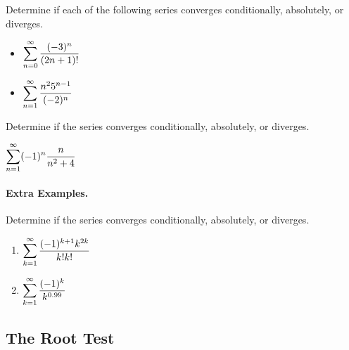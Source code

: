 \documentclass[12pt]{article}
\begin{document}
\newpage

\Examples Determine if each of the following series converges conditionally, absolutely, or diverges.

\begin{itemize}
\item[\tc{1}] $\displaystyle\sum_{n=0}^\infty\dfrac{(-3)^n}{(2n+1)!}$

\vfill

\item[\tc{2}] $\displaystyle\sum_{n=1}^\infty\dfrac{n^2 5^{n-1}}{(-2)^n}$

\vfill

\newpage

\end{itemize}

\Example Determine if the series converges conditionally, absolutely, or diverges.

\vspace{3mm}

$\displaystyle\sum_{n=1}^\infty(-1)^n\dfrac{n}{n^2+4}$
\vfill

\paragraph*{Extra Examples.} Determine if the series converges conditionally, absolutely, or diverges.

\begin{multicols}{2}
\begin{enumerate}
\item[\tc{1}] $\displaystyle\sum_{k=1}^\infty\dfrac{(-1)^{k+1}k^{2k}}{k!k!}$

\item[\tc{2}] $\displaystyle\sum_{k=1}^\infty\dfrac{(-1)^k}{k^{0.99}}$
\end{enumerate}

\end{multicols}
\vspace{3mm}


\newpage

\subsection*{The Root Test}

\end{document}
